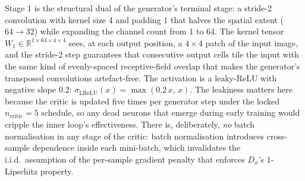 
Stage 1 is the structural dual of the generator's terminal stage: a
stride-2 convolution with kernel size 4 and padding 1 that halves the
spatial extent ($64 \to 32$) while expanding the channel count from 1 to
64. The kernel tensor $W_1 \in \mathbb{R}^{1 \times 64 \times 4 \times
4}$ sees, at each output position, a $4 \times 4$ patch of the input
image, and the stride-2 step guarantees that consecutive output cells
tile the input with the same kind of evenly-spaced receptive-field
overlap that makes the generator's transposed convolutions
artefact-free. The activation is a leaky-ReLU with negative slope
$0.2$: $\sigma_{\mathrm{LReLU}}(x) = \max(0.2\,x,\,x)$. The leakiness
matters here because the critic is updated five times per generator
step under the locked $n_{\mathrm{critic}} = 5$ schedule, so any dead
neurons that emerge during early training would cripple the inner
loop's effectiveness. There is, deliberately, \emph{no} batch
normalisation in any stage of the critic: batch normalisation
introduces cross-sample dependence inside each mini-batch, which
invalidates the i.i.d.\ assumption of the per-sample gradient penalty
that enforces $D_\phi$'s 1-Lipschitz property.
